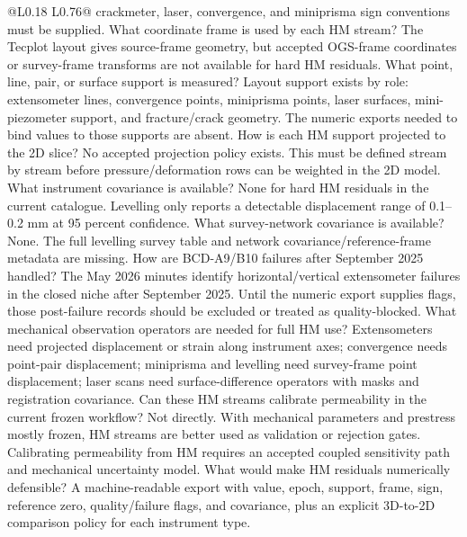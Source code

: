 \begin{longtable}{@{}L{0.18\textwidth} L{0.76\textwidth}@{}}
{crackmeter, laser, convergence, and miniprisma sign conventions must be supplied.}
{ What coordinate frame is used by each HM stream?}
{The Tecplot layout gives source-frame geometry, but accepted OGS-frame coordinates
or survey-frame transforms are not available for hard HM residuals.}
{ What point, line, pair, or surface support is measured?}
{Layout support exists by role: extensometer lines, convergence points, miniprisma
points, laser surfaces, mini-piezometer support, and fracture/crack geometry.  The
numeric exports needed to bind values to those supports are absent.}
{ How is each HM support projected to the 2D slice?}
{No accepted projection policy exists.  This must be defined stream by stream before
pressure/deformation rows can be weighted in the 2D model.}
{ What instrument covariance is available?}
{None for hard HM residuals in the current catalogue.  Levelling only reports a
detectable displacement range of 0.1--0.2 mm at 95 percent confidence.}
{ What survey-network covariance is available?}
{None.  The full levelling survey table and network covariance/reference-frame
metadata are missing.}
{ How are BCD-A9/B10 failures after September 2025 handled?}
{The May 2026 minutes identify horizontal/vertical extensometer failures in the
closed niche after September 2025.  Until the numeric export supplies flags, those
post-failure records should be excluded or treated as quality-blocked.}
{ What mechanical observation operators are needed for full HM use?}
{Extensometers need projected displacement or strain along instrument axes;
convergence needs point-pair displacement; miniprisma and levelling need survey-frame
point displacement; laser scans need surface-difference operators with masks and
registration covariance.}
{ Can these HM streams calibrate permeability in the current frozen workflow?}
{Not directly.  With mechanical parameters and prestress mostly frozen, HM streams
are better used as validation or rejection gates.  Calibrating permeability from HM
requires an accepted coupled sensitivity path and mechanical uncertainty model.}
{ What would make HM residuals numerically defensible?}
{A machine-readable export with value, epoch, support, frame, sign, reference zero,
quality/failure flags, and covariance, plus an explicit 3D-to-2D comparison policy
for each instrument type.}
\bottomrule
\end{longtable}

